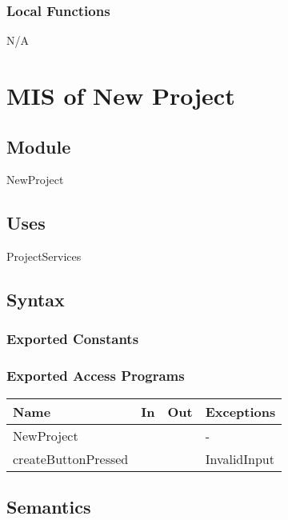 \documentclass[12pt, titlepage]{article}
\begin{document}
	\subsubsection{Local Functions}
	
	N/A
	
	\newpage
	
	\section{MIS of New Project} \label{Module} 
	
	\subsection{Module}
	
	NewProject
	
	\subsection{Uses}
	ProjectServices
	
	\subsection{Syntax}
	
	\subsubsection{Exported Constants}
	
	\subsubsection{Exported Access Programs}
	
	\begin{center}
		\begin{tabular}{p{2cm} p{4cm} p{4cm} p{2cm}}
			\hline
			\textbf{Name} & \textbf{In} & \textbf{Out} & \textbf{Exceptions} \\
			\hline
			NewProject &  &  & - \\
			\hline
			createButtonPressed &  &  & InvalidInput \\
			\hline
		\end{tabular}
	\end{center}
	
	\subsection{Semantics}
	
\end{document}
